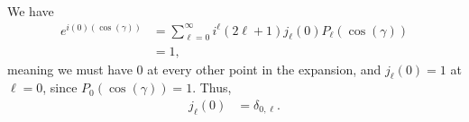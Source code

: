 \documentclass[10pt]{mypackage}
\begin{document}
\begin{solution}[35.25]
  We have
  \begin{align*}
    e^{i\left( 0 \right)\left( \cos\left( \gamma \right) \right)} &= \sum_{\ell = 0}^{\infty}i^{\ell}\left( 2\ell + 1 \right)j_{\ell}\left( 0 \right)P_{\ell}\left( \cos\left( \gamma \right) \right)\\
                                                                  &= 1,
  \end{align*}
  meaning we must have $0$ at every other point in the expansion, and $j_{\ell}\left( 0 \right) = 1$ at $\ell = 0$, since $P_{0}\left( \cos\left( \gamma \right) \right) = 1$. Thus,
  \begin{align*}
    j_{\ell}\left( 0 \right) &= \delta_{0,\ell}.
  \end{align*}
  
\end{solution}
\end{document}
